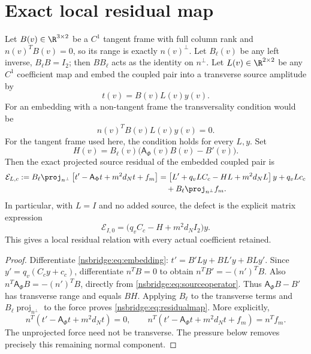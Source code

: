 \section{Exact local residual map}
Let $B(v)\in\R^{3\times2}$ be a $C^1$ tangent frame with full column rank and
$n(v)^TB(v)=0$, so its range is exactly $n(v)^\perp$.  Let $B_\ell(v)$ be any
left inverse, $B_\ell B=I_2$; then $B B_\ell$ acts as the identity on
$n^\perp$.  Let $L(v)\in\R^{2\times2}$ be any $C^1$ coefficient map and embed
the coupled pair into a transverse source amplitude by
\begin{equation}
 t(v)=B(v)L(v)y(v).
 \label{nsbridge:eq:embedding}
\end{equation}
For an embedding with a non-tangent frame the transversality condition would be
\begin{equation}
 n(v)^TB(v)L(v)y(v)=0.
 \label{nsbridge:eq:transversecondition}
\end{equation}
For the tangent frame used here, the condition holds for every $L,y$.  Set
\begin{equation}
 H(v)=B_\ell(v)\bigl(\mathsf A_\Phi(v)B(v)-B'(v)\bigr).
 \label{nsbridge:eq:Hdef}
\end{equation}
Then the exact projected source residual of the embedded coupled pair is
\begin{align}
 \mathcal E_{L,c}:=B_\ell\proj_{n^\perp}
 \left[t'-\mathsf A_\Phi t+m^2d_Nt+f_m\right]
 &=\left[L'+q_vLC_c-HL+m^2d_NL\right]y+q_vLc_c \\
 &\quad+B_\ell\proj_{n^\perp}f_m.
 \label{nsbridge:eq:residualmap}
\end{align}
In particular, with $L=I$ and no added source, the defect is the explicit
matrix expression
\begin{equation}
 \mathcal E_{I,0}=\bigl(q_vC_c-H+m^2d_NI_2\bigr)y.
 \label{nsbridge:eq:identitydefect}
\end{equation}
This gives a local residual relation with every actual coefficient retained.

\begin{proof}
Differentiate \eqref{nsbridge:eq:embedding}:
$t'=B'L y+B L'y+B L y'$.  Since $y'=q_v(C_cy+c_c)$,
differentiate $n^TB=0$ to obtain $n^TB'=-(n')^TB$. Also
$n^T\mathsf A_\Phi B=-(n')^TB$, directly from
\eqref{nsbridge:eq:sourceoperator}. Thus $\mathsf A_\Phi B-B'$ has transverse
range and equals $BH$. Applying $B_\ell$ to the transverse terms and
$B_\ell\operatorname{proj}_{n^\perp}$ to the force proves
\eqref{nsbridge:eq:residualmap}. More explicitly,
\begin{equation}
 n^T(t'-\mathsf A_\Phi t+m^2d_Nt)=0,\qquad
 n^T(t'-\mathsf A_\Phi t+m^2d_Nt+f_m)=n^Tf_m.
\end{equation}
The unprojected force need not be transverse. The pressure below removes
precisely this remaining normal component.
\end{proof}

